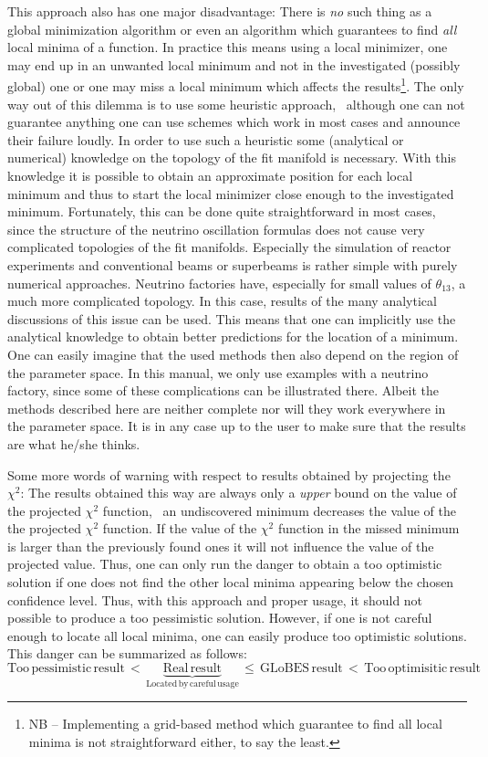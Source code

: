 This approach also has one major disadvantage: There is \emph{no} such
thing as a global minimization algorithm or even an algorithm which guarantees
to find \emph{all} local minima of a function. In practice this means using 
 a local minimizer, one may end up in an unwanted local minimum and not in 
the investigated (possibly global) one or 
one may miss a local minimum which affects the results\footnote{NB -- 
Implementing a grid-based method which guarantee to find all local minima is
not straightforward either, to say the least.}. 
The only way out of this dilemma is to use some heuristic approach, \ie\
although one can not guarantee anything one can use schemes which work
in most cases and announce their failure loudly. In order to use such a
heuristic some (analytical or numerical) knowledge on the topology of 
the fit manifold is necessary. With this knowledge it is possible
to obtain an approximate position for each local minimum 
and thus to start the local minimizer 
close enough to the investigated minimum.
 Fortunately, this can be done quite straightforward in most cases, since 
the structure of the neutrino oscillation formulas does not cause very 
complicated topologies of the fit manifolds. Especially the simulation of 
reactor experiments and conventional beams or superbeams is rather simple 
with purely numerical
approaches. Neutrino factories have, especially for small values of
$\theta_{13}$, a much more complicated topology. In this case, results
of the many analytical discussions of this issue can be used. This means
 that one can implicitly use the analytical knowledge to obtain 
better predictions for the location of a minimum. One can easily imagine 
that the used methods then also depend
on the region of the parameter space. In this manual, we only use
examples with a neutrino factory, since some of these complications
can be illustrated there. Albeit the methods described here are neither
complete nor will they work everywhere in the parameter space. It is
in any case up to the user to make sure that the results are what he/she
thinks.

Some more words of warning with respect to results obtained by projecting
the $\chi^2$:
The results obtained this way are always only a \emph{upper} bound on the
value of the projected $\chi^2$ function, \ie\ an undiscovered minimum 
decreases the value of the the projected $\chi^2$ function. If the value
of the $\chi^2$ function in the missed minimum is larger than the
previously found ones it will not influence the value of the projected 
value. 
Thus, one can only run the danger to obtain a too optimistic solution 
if one does not find the other local minima appearing 
below the chosen confidence level. Thus, with this approach and proper usage,
 it should not possible to produce a too pessimistic solution. 
However, if one is not careful enough to locate
all local minima, one can easily produce too optimistic solutions.
This danger can be summarized as follows:
\begin{equation}
\mathrm{Too \, pessimistic \, result} \, < \, \underbrace{\mathrm{Real \, result}}_{\mathrm{Located \, by \, careful \, usage}} \, \le \, \mathrm{GLoBES \, result} \,  < \,  \mathrm{Too \, optimisitic \, result} \nonumber
\end{equation}

